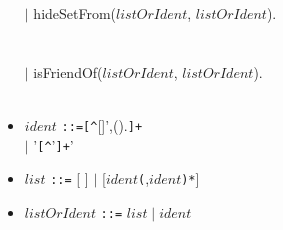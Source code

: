\documentclass[]{article}
\begin{document}
\begin{itemize}
\begin{tabbing}
		\>$|$ hideSetFrom($listOrIdent$, $listOrIdent$).\\	
		\>\color{light-gray}{hideSetFrom(elementSet, interlopers)}\\
		\\
		
		\>$|$ isFriendOf($listOrIdent$, $listOrIdent$).\\
		\>\color{light-gray}{isFriendOf(scopeSet, beFriended)}\\
		
	\end{tabbing}

	\item \begin{tabbing}
		$ident$ \verb|::|\=\verb|=[^|[]',().\verb|]+|\\		
		\>$|$ '\verb|[^|'\verb|]+|'
	\end{tabbing}
	
	\item $list$ \verb|::=| [ ] $|$ [$ident$\verb|(|,$ident$\verb|)*|]\\		
	
	\item $listOrIdent$ \verb|::=| $list\; |\; ident$\\		
		
\end{itemize}
\end{document}
